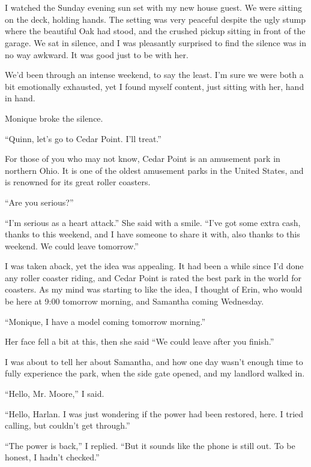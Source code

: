 \chapter{}
I watched the Sunday evening sun set with my new house guest. We were sitting on the deck,
holding hands. The setting was very peaceful despite the ugly stump where the beautiful Oak had
stood, and the crushed pickup sitting in front of the garage. We sat in silence, and I was
pleasantly surprised to find the silence was in no way awkward. It was good just to be with her.

We'd been through an intense weekend, to say the least. I'm sure we were both a bit
emotionally exhausted, yet I found myself content, just sitting with her, hand in hand.

Monique broke the silence.

``Quinn, let's go to Cedar Point. I'll treat.''

For those of you who may not know, Cedar Point is an amusement park in northern Ohio. It is
one of the oldest amusement parks in the United States, and is renowned for its great roller
coasters.

``Are you serious?''

``I'm serious as a heart attack.'' She said with a smile. ``I've got some extra cash, thanks to
this weekend, and I have someone to share it with, also thanks to this weekend. We could leave
tomorrow.''

I was taken aback, yet the idea was appealing. It had been a while since I'd done any roller
coaster riding, and Cedar Point is rated the best park in the world for coasters. As my mind was
starting to like the idea, I thought of Erin, who would be here at 9:00 tomorrow morning, and
Samantha coming Wednesday.

``Monique, I have a model coming tomorrow morning.''

Her face fell a bit at this, then she said ``We could leave after you finish.''

I was about to tell her about Samantha, and how one day wasn't enough time to fully
experience the park, when the side gate opened, and my landlord walked in.

``Hello, Mr. Moore,'' I said.

``Hello, Harlan. I was just wondering if the power had been restored, here. I tried calling,
but couldn't get through.''

``The power is back,'' I replied. ``But it sounds like the phone is still out. To be honest, I
hadn't checked.''

